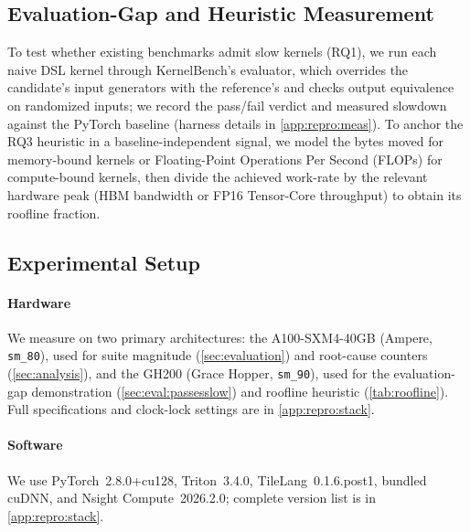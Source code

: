 \subsection{Evaluation-Gap and Heuristic Measurement}
\label{sec:meth:evalgap}

To test whether existing benchmarks admit slow kernels (RQ1), we run each naive DSL kernel through KernelBench's evaluator, which overrides the candidate's input generators with the reference's and checks output equivalence on randomized inputs; we record the pass/fail verdict and measured slowdown against the PyTorch baseline (harness details in \cref{app:repro:meas}).
To anchor the RQ3 heuristic in a baseline-independent signal, we model the bytes moved for memory-bound kernels or Floating-Point Operations Per Second (FLOPs) for compute-bound kernels, then divide the achieved work-rate by the relevant hardware peak (HBM bandwidth or FP16 Tensor-Core throughput) to obtain its roofline fraction.


\subsection{Experimental Setup}
\label{sec:meth:setup}

\paragraph{Hardware}
We measure on two primary architectures: the A100-SXM4-40GB (Ampere, \texttt{sm\_80}), used for suite magnitude (\cref{sec:evaluation}) and root-cause counters (\cref{sec:analysis}), and the GH200 (Grace Hopper, \texttt{sm\_90}), used for the evaluation-gap demonstration (\cref{sec:eval:passesslow}) and roofline heuristic (\cref{tab:roofline}).
Full  specifications and clock-lock settings are in \cref{app:repro:stack}.

\paragraph{Software}
We use PyTorch~2.8.0+cu128, Triton~3.4.0, TileLang~0.1.6.post1, bundled cuDNN, and Nsight Compute~2026.2.0; complete version list is in \cref{app:repro:stack}.
